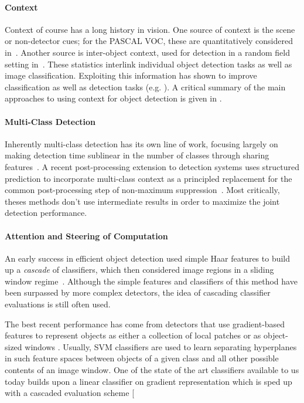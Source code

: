 \paragraph{Context}
Context of course has a long history in vision.
One source of context is the scene or non-detector cues; for the PASCAL VOC, these are quantitatively considered in~\cite{Divvala2009}. 
Another source is inter-object context, used for detection in a random field setting in~\cite{Torralba2004}. These  statistics interlink individual object detection tasks as well as image classification. Exploiting this information has shown to improve classification as well as detection tasks (e.g. \cite{Torralba, visual phrases}).
A critical summary of the main approaches to using context for object detection is given in \cite{Galleguillos2010}.

\paragraph{Multi-Class Detection}
Inherently multi-class detection has its own line of work, focusing largely on making detection time sublinear in the number of classes through sharing features~\cite{Torralba2007,Fan2005,Razavi2011}.
A recent post-processing extension to detection systems uses structured prediction to incorporate multi-class context as a principled replacement for the common post-processing step of non-maximum suppression~\cite{Desai2009}. Most critically, theses methods don't use intermediate results in order to maximize the joint detection performance.

\paragraph{Attention and Steering of Computation}
An early success in efficient object detection used simple Haar features to build up a \emph{cascade} of classifiers, which then considered image regions in a sliding window regime~\cite{Viola2001}.
Although the simple features and classifiers of this method have been surpassed by more complex detectors, the idea of cascading classifier evaluations is still often used.

The best recent performance has come from detectors that use gradient-based features to represent objects as either a collection of local patches or as object-sized windows \cite{Dalal2005,Lowe2004}.
Usually, SVM classifiers are used to learn separating hyperplanes in such feature spaces between objects of a given class and all other possible contents of an image window. One of the state of the art classifiers available to us today builds upon a linear classifier on gradient representation which is sped up with a cascaded evaluation scheme \cite{DPM-cascade}[

